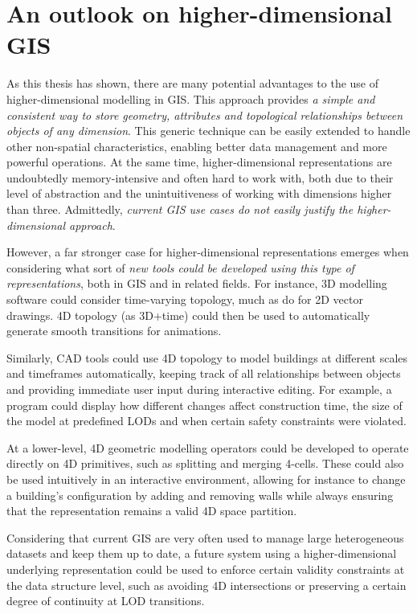 \section{An outlook on higher-dimensional GIS}
\label{se:isitworthit}

As this thesis has shown, there are many potential advantages to the use of higher-dimensional modelling in GIS.\@
This approach provides \emph{a simple and consistent way to store geometry, attributes and topological relationships between objects of any dimension}.
This generic technique can be easily extended to handle other non-spatial characteristics, enabling better data management and more powerful operations.
At the same time, higher-dimensional representations are undoubtedly memory-intensive and often hard to work with, both due to their level of abstraction and the unintuitiveness of working with dimensions higher than three.
Admittedly, \emph{current GIS use cases do not easily justify the higher-dimensional approach}.


However, a far stronger case for higher-dimensional representations emerges when considering what sort of \emph{new tools could be developed using this type of representations}, both in GIS and in related fields.
For instance, 3D modelling software could consider time-varying topology, much as \citet{Dalstein15} do for 2D vector drawings.
4D topology (as 3D+time) could then be used to automatically generate smooth transitions for animations.

Similarly, CAD tools could use 4D topology to model buildings at different scales and timeframes automatically, keeping track of all relationships between objects and providing immediate user input during interactive editing.
For example, a program could display how different changes affect construction time, the size of the model at predefined LODs and when certain safety constraints were violated.

At a lower-level, 4D geometric modelling operators could be developed to operate directly on 4D primitives, such as splitting and merging 4-cells.
These could also be used intuitively in an interactive environment, allowing for instance to change a building's configuration by adding and removing walls while always ensuring that the representation remains a valid 4D space partition.

Considering that current GIS are very often used to manage large heterogeneous datasets and keep them up to date, a future system using a higher-dimensional underlying representation could be used to enforce certain validity constraints at the data structure level, such as avoiding 4D intersections or preserving a certain degree of continuity at LOD transitions.

